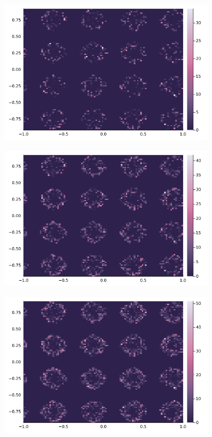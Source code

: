 \documentclass[]{article}
\theoremstyle{definition}
\begin{document}
        \begin{figure}[H]
            \centering
            \begin{subfigure}{0.3\textwidth}
                \includegraphics[width=\textwidth]{uniform_base(1).png}
            \end{subfigure}
            \hfill
            \begin{subfigure}{0.3\textwidth}
                \includegraphics[width=\textwidth]{uniform_base(2).png}    
            \end{subfigure}
            \hfill
            \begin{subfigure}{0.3\textwidth}
                \includegraphics[width=\textwidth]{uniform_base(3).png}                

\end{subfigure}
\end{figure}
\end{document}
